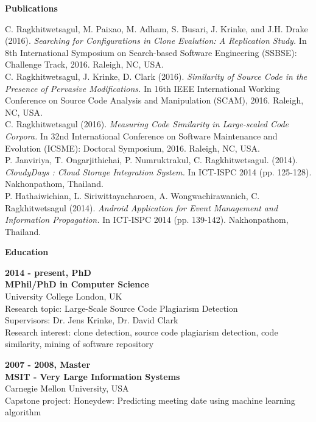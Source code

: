 \documentclass[a4paper,12pt,final]{memoir}
\newcommand{\Sep}{\vspace{1.5em}}
\newcommand{\SmallSep}{\vspace{0.5em}}
\newcommand{\CVSection}[1]
	{\Large\textbf{#1}\par
	\SmallSep\normalsize\normalfont}
\newcommand{\CVItem}[1]
	{\textbf{\color{RoyalBlue} #1}}
\begin{document}
\CVSection{Publications}
C. Ragkhitwetsagul, M. Paixao, M. Adham, S. Busari, J. Krinke, and J.H. Drake (2016). \textit{Searching for Configurations in Clone Evalution: A Replication Study.} In 8th International Symposium on Search-based Software Engineering (SSBSE): Challenge Track, 2016. Raleigh, NC, USA. \\

C. Ragkhitwetsagul, J. Krinke, D. Clark (2016). \textit{Similarity of Source Code in the Presence of Pervasive Modifications.} In 16th IEEE International Working Conference on Source Code Analysis and Manipulation (SCAM), 2016. Raleigh, NC, USA. \\ 

C. Ragkhitwetsagul (2016). \textit{Measuring Code Similarity in Large-scaled Code Corpora.} In 32nd International Conference on Software Maintenance and Evolution (ICSME): Doctoral Symposium, 2016. Raleigh, NC, USA. \\ 

P. Janviriya, T. Ongarjithichai, P. Numruktrakul, C. Ragkhitwetsagul. (2014). \textit{CloudyDays : Cloud Storage Integration System.} In ICT-ISPC 2014 (pp. 125-128). Nakhonpathom, Thailand. \\ 

P. Hathaiwichian, L. Siriwittayacharoen, A. Wongwachirawanich, \newline C. Ragkhitwetsagul (2014). \textit{Android Application for Event Management and Information Propagation.} In ICT-ISPC 2014 (pp. 139-142). Nakhonpathom, Thailand.
\SmallSep
\Sep

\clearpage
\framebreak
\framebreak

\CVSection{Education}
\CVItem{2014 - present, PhD}\\
\textbf{MPhil/PhD in Computer Science}\\
University College London, UK\\
Research topic: Large-Scale Source Code Plagiarism Detection\\
Supervisors: Dr. Jens Krinke, Dr. David Clark\\
Research interest: clone detection, source code plagiarism detection, code similarity, mining of software repository
\SmallSep

\CVItem{2007 - 2008, Master}\\
\textbf{MSIT - Very Large Information Systems}\\
Carnegie Mellon University, USA\\
Capstone project: Honeydew: Predicting meeting date using machine learning algorithm
\end{document}
